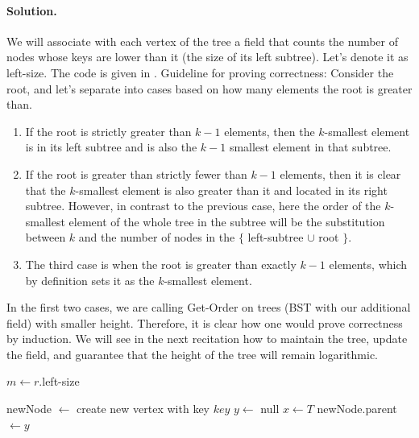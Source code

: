 \paragraph{Solution.} We will associate with each vertex of the tree a field that counts the number of nodes whose keys are lower than it (the size of its left subtree). Let's denote it as left-size. The code is given in . Guideline for proving correctness:
Consider the root, and let's separate into cases based on how many elements the root is greater than.
\begin{enumerate}
  \item If the root is strictly greater than $k-1$ elements, then the $k$-smallest element is in its left subtree and is also the $k-1$ smallest element in that subtree.
  \item If the root is greater than strictly fewer than $k-1$ elements, then it is clear that the $k$-smallest element is also greater than it and located in its right subtree. However, in contrast to the previous case, here the order of the $k$-smallest element of the whole tree in the subtree will be the substitution between $k$ and the number of nodes in the $\{$ left-subtree $\cup$ root $\}$.
  \item The third case is when the root is greater than exactly $k-1$ elements, which by definition sets it as the $k$-smallest element.
\end{enumerate}
In the first two cases, we are calling Get-Order on trees (BST with our additional field) with smaller height. Therefore, it is clear how one would prove correctness by induction. We will see in the next recitation how to maintain the tree, update the field, and guarantee that the height of the tree will remain logarithmic.
  \begin{algorithm}
       $m \leftarrow r$.left-size \\ 
        \caption{Get-Order }
\label{alg:kstat}
      \end{algorithm}



\begin{algorithm}
\SetAlgoLined
{}
    newNode $\leftarrow$ create new vertex with key $key$\;
    $y \leftarrow$ null\;
    $x \leftarrow T$\;
    newNode.parent $\leftarrow y$\;
\caption{Insert}
\end{algorithm}

